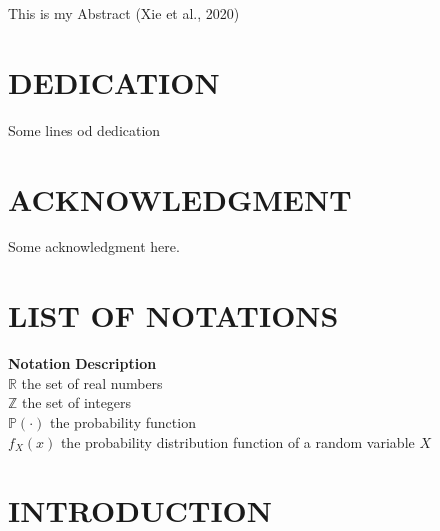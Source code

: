 \documentclass{source/tex/templates/maththesis}
\begin{document}
This is my Abstract (Xie et al., 2020)

\hypertarget{dedication}{%
\chapter*{DEDICATION}\label{dedication}}

Some lines od dedication

\hypertarget{acknowledgment}{%
\chapter*{ACKNOWLEDGMENT}\label{acknowledgment}}

Some acknowledgment here.

\tableofcontents
{}

\newpage
{}\setcounter{page}{1}

\hypertarget{list-of-notations}{%
\chapter*{LIST OF NOTATIONS}\label{list-of-notations}}

\begin{tabbing}

\hspace{0.25in} \={\bf Notation} \hspace{0.5in}\={\bf Description}\\ 
\>$\mathbb{R}$ \>the set of real numbers \\
\>$\mathbb{Z}$ \>the set of integers \\
\>$\mathbb{P}(\cdot)$ \>the probability function \\
\>$f_X(x)$ \>the probability distribution function of a random variable $X$ \\

\end{tabbing}

\listoffigures\newpage
{}

\listoftables\newpage
{}

\hypertarget{introduction}{%
\chapter{INTRODUCTION}\label{introduction}}
\end{document}

